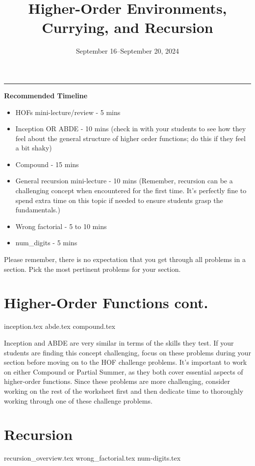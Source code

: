 \documentclass{exam}
\title{Higher-Order Environments, Currying, and Recursion}
\date{September 16--September 20, 2024}
\begin{document}
\maketitle
\rule{\textwidth}{0.15em}
\fontsize{12}{15}\selectfont

\begin{meta}
\textbf{Recommended Timeline}
\begin{itemize}
    \item HOFs mini-lecture/review - 5 mins
    \item Inception OR ABDE - 10 mins (check in with your students to see how they feel about the general structure of higher order functions; do this if they feel a bit shaky)
    \item Compound - 15 mins
    \item General recursion mini-lecture - 10 mins (Remember, recursion can be a challenging concept when encountered for the first time. It's perfectly fine to spend extra time on this topic if needed to ensure students grasp the fundamentals.)
    \item Wrong factorial - 5 to 10 mins
    \item num\_digits - 5 mins
\end{itemize}
Please remember, there is no expectation that you get through all problems in a section. Pick the most pertinent problems for your section. 
\end{meta}

\begin{questions}
    \section{Higher-Order Functions cont.}
    {inception.tex}
    {abde.tex}
    {compound.tex}
    \begin{questionmeta}
        Inception and ABDE are very similar in terms of the skills they test. If your students are finding this concept challenging, focus on these problems during your section before moving on to the HOF challenge problems. It's important to work on either Compound or Partial Summer, as they both cover essential aspects of higher-order functions. Since these problems are more challenging, consider working on the rest of the worksheet first and then dedicate time to thoroughly working through one of these challenge problems.
    \end{questionmeta}

    \section{Recursion}
    {recursion_overview.tex}
    {wrong_factorial.tex}
    {num-digits.tex}
\end{questions}
\end{document}
